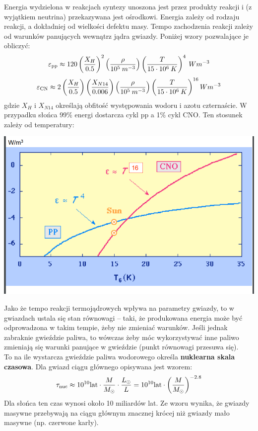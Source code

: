 \documentclass[../index.tex]{subfiles}
\begin{document}
                Energia wydzielona w reakcjach syntezy unoszona jest przez produkty reakcji i (z wyjątkiem neutrina) przekazywana jest ośrodkowi. Energia zależy od rodzaju reakcji, a dokładniej od wielkości defektu masy. Tempo zachodzenia reakcji zależy od warunków panujących wewnątrz jądra gwiazdy. Poniżej wzory pozwalające je obliczyć:
                \begin{equation}
                    \varepsilon_\text{pp} \approx 120 \left(\frac{X_H}{0.5} \right)^2 \left(\frac{\rho}{10^{5}\:m^{-3}}\right)\left(\frac{T}{15\cdot 10^6\:K}\right)^4\: Wm^{-3}
                \end{equation}
                \begin{equation}
                    \varepsilon_\text{CN} \approx 2\left(\frac{X_H}{0.5}\right)\left(\frac{X_{N14}}{0.006} \right)\left(\frac{\rho}{10^5\: m^{-3}} \right)\left(\frac{T}{15\cdot 10^6\:K}\right)^{16} Wm^{-3}
                \end{equation}
                gdzie \(X_H\) i \(X_{N{14}}\) określają obfitość występowania wodoru i azotu czternaście. W przypadku słońca 99\% energi dostarcza cykl pp a 1\% cykl CNO. Ten stosunek zależy od temperatury:
                \begin{center}
                    \includegraphics[width=15cm]{images/cykleSynteza.png}
                \end{center}
                Jako że tempo reakcji termojądrowych wpływa na parametry gwiazdy, to w gwiazdach ustala się stan równowagi \--- taki, że produkowana energia może być odprowadzona w takim tempie, żeby nie zmieniać warunków. Jeśli jednak zabraknie gwieździe paliwa, to wówczas żeby móc wykorzystywać inne paliwo zmieniają się warunki panujące w gwieździe (punkt równowagi przesuwa się).\\
                To na ile wystarcza gwieździe paliwa wodorowego określa \textbf{nuklearna skala czasowa}. Dla gwiazd ciągu głównego opisywana jest wzorem:
                \begin{equation}
                    \tau_\text{nuc} \approx 10^{10}\text{lat} \cdot \frac{M}{M_\odot} \cdot \frac{L_\odot}{L} = 10^{10}\text{lat} \cdot \left(\frac{M}{M_\odot}\right)^{-2.8}
                \end{equation}
                Dla słońca ten czas wynosi około 10 miliardów lat. Ze wzoru wynika, że gwiazdy masywne przebywają na ciągu głównym znacznej krócej niż gwiazdy mało masywne (np. czerwone karły).
\end{document}
